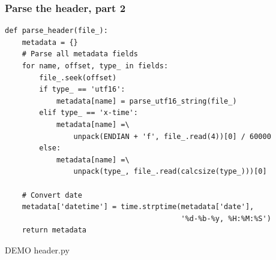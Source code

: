 \documentclass{beamer}
\begin{document}
\begin{frame}[fragile]
  \frametitle{Parse the header, part 2}
  \small
  \begin{verbatim}
def parse_header(file_):
    metadata = {}
    # Parse all metadata fields
    for name, offset, type_ in fields:
        file_.seek(offset)
        if type_ == 'utf16':
            metadata[name] = parse_utf16_string(file_)
        elif type_ == 'x-time':
            metadata[name] =\
                unpack(ENDIAN + 'f', file_.read(4))[0] / 60000
        else:
            metadata[name] =\
                unpack(type_, file_.read(calcsize(type_)))[0]

    # Convert date
    metadata['datetime'] = time.strptime(metadata['date'],
                                         '%d-%b-%y, %H:%M:%S')
    return metadata
  \end{verbatim}
  \LARGE DEMO header.py
\end{frame}
\end{document}
